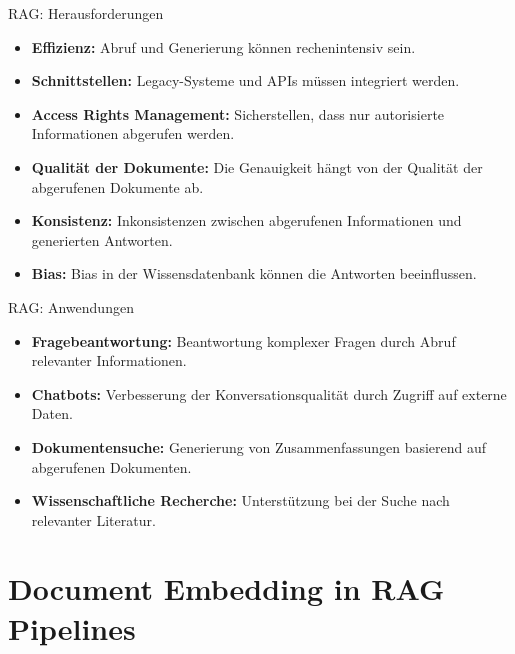 \documentclass[aspectratio=1610, xcolor=dvipsnames, 9pt]{beamer}
\begin{document}
\begin{frame}{RAG: Herausforderungen}
  \begin{itemize}
    \item \textbf{Effizienz:} Abruf und Generierung können rechenintensiv sein. \\
    \item \textbf{Schnittstellen:} Legacy-Systeme und APIs müssen integriert werden. \\
    \item \textbf{Access Rights Management:} Sicherstellen, dass nur autorisierte Informationen abgerufen werden. \\
    \item \textbf{Qualität der Dokumente:} Die Genauigkeit hängt von der Qualität der abgerufenen Dokumente ab. \\
    \item \textbf{Konsistenz:} Inkonsistenzen zwischen abgerufenen Informationen und generierten Antworten. \\
    \item \textbf{Bias:} Bias in der Wissensdatenbank können die Antworten beeinflussen.
  \end{itemize}
\end{frame}

\begin{frame}{RAG: Anwendungen}
  \begin{itemize}
    \item \textbf{Fragebeantwortung:} Beantwortung komplexer Fragen durch Abruf relevanter Informationen. \\
    \item \textbf{Chatbots:} Verbesserung der Konversationsqualität durch Zugriff auf externe Daten. \\
    \item \textbf{Dokumentensuche:} Generierung von Zusammenfassungen basierend auf abgerufenen Dokumenten. \\
    \item \textbf{Wissenschaftliche Recherche:} Unterstützung bei der Suche nach relevanter Literatur.
  \end{itemize}
\end{frame}

\section{Document Embedding in RAG Pipelines}
\end{document}
